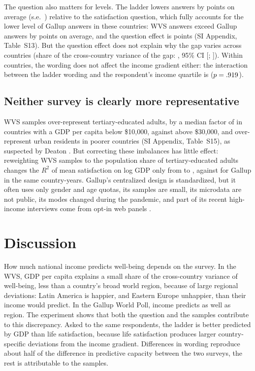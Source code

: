 \documentclass[10pt]{article}
\providecommand{\SIref}[3]{#2}
\begin{document}
The question also matters for levels. The ladder lowers answers by \effectLadder points on average (s.e.\ \seLadder) relative to the satisfaction question, which fully accounts for the lower level of Gallup answers in these countries: WVS answers exceed Gallup answers by \decompMeanGap points on average, and the question effect is \decompMeanQuestion points (SI Appendix, Table~\SIref{tab:decomposition_country}{S13}{Results}). But the question effect does not explain why the gap varies across countries (share of the cross-country variance of the gap: \decompVarShareQuestion, 95\% CI [\decompLowVarShareQuestion; \decompHighVarShareQuestion]). Within countries, the wording does not affect the income gradient either: the interaction between the ladder wording and the respondent's income quartile is \interactionLadderIncome ($p = .919$).

\subsection*{Neither survey is clearly more representative}

WVS samples over-represent tertiary-educated adults, by a median factor of \ratioTertiaryLow in countries with a GDP per capita below \$10,000, against \ratioTertiaryHigh above \$30,000, and over-represent urban residents in poorer countries (SI Appendix, Table~\SIref{tab:representativeness}{S15}{Results}), as suspected by Deaton \citep{deaton_income_2008}. But correcting these imbalances has little effect: reweighting WVS samples to the population share of tertiary-educated adults changes the $R^2$ of mean satisfaction on log GDP only from \RtwoCommonWVSraw to \RtwoCommonWVSeduAdj, against \RtwoCommonGallupSub for Gallup in the same country-years. Gallup's centralized design is standardized, but it often uses only gender and age quotas, its samples are small, its microdata are not public, its modes changed during the pandemic, and part of its recent high-income interviews come from opt-in web panels \citep{gallup_methodology_2023}.

\section*{Discussion}

How much national income predicts well-being depends on the survey. In the WVS, GDP per capita explains a small share of the cross-country variance of well-being, less than a country's broad world region, because of large regional deviations: Latin America is happier, and Eastern Europe unhappier, than their income would predict. In the Gallup World Poll, income predicts as well as region. The experiment shows that both the question and the samples contribute to this discrepancy. Asked to the same respondents, the ladder is better predicted by GDP than life satisfaction, because life satisfaction produces larger country-specific deviations from the income gradient. Differences in wording reproduce about half of the difference in predictive capacity between the two surveys, the rest is attributable to the samples. %
\end{document}
